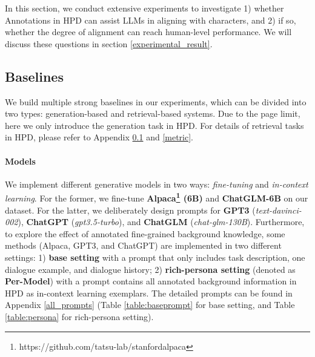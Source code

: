 \documentclass[11pt]{article}
\begin{document}
%
 
In this section, we conduct extensive experiments to investigate 1) whether Annotations in HPD can assist LLMs in aligning with characters, and 2) if so, whether the degree of alignment can reach human-level performance. We will discuss these questions in section \ref{experimental_result}. 

\subsection{Baselines}
\label{baselines}
We build multiple strong baselines in our experiments, which can be divided into two types: generation-based  and retrieval-based systems. Due to the page limit, here we only introduce the generation task in HPD. For details of retrieval tasks in HPD, please refer to Appendix \ref{baselines} and \ref{metric}.

\paragraph{Models}
We implement different generative models in two ways: \textit{fine-tuning} and \textit{in-context learning}. 
For the former, we fine-tune \textbf{Alpaca\footnote{https://github.com/tatsu-lab/stanfordalpaca} (6B)} and \textbf{ChatGLM-6B} on our dataset. For the latter, we deliberately design prompts for \textbf{GPT3} \cite{DBLP:journals/corr/abs-2005-14165} (\textit{text-davinci-002}), \textbf{ChatGPT} (\textit{gpt3.5-turbo}), and \textbf{ChatGLM} \cite{zeng2022glm} (\textit{chat-glm-130B}). Furthermore, to explore the effect of annotated fine-grained background knowledge, some methods (Alpaca, GPT3, and ChatGPT) are implemented in two different settings: 1) \textbf{base setting} with a prompt that only includes task description, one dialogue example, and dialogue history;  2) \textbf{rich-persona setting} (denoted as \textbf{Per-Model}) with a prompt contains all annotated background information in HPD as in-context learning exemplars. The detailed prompts can be found in Appendix \ref{all_prompts} (Table \ref{table:baseprompt} for base setting, and Table \ref{table:persona} for rich-persona setting).
\end{document}
